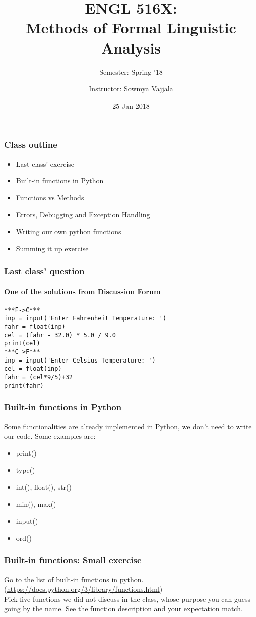 \documentclass{beamer}
\author[Sowmya Vajjala]{Instructor: Sowmya Vajjala}
\title[ENGL 516X]{ENGL 516X: \\ Methods of Formal Linguistic Analysis}
\subtitle{Semester: Spring '18}
\date{25 Jan 2018}
\institute{Iowa State University, USA}
\begin{document}
\begin{frame}\titlepage
\end{frame}


\begin{frame}%
\frametitle{Class outline}
\begin{itemize}
\item Last class' exercise%
\item Built-in functions in Python
\item Functions vs Methods
\item Errors, Debugging and Exception Handling %
\item Writing our own python functions
\item Summing it up exercise%
\end{itemize} %
\end{frame}

\begin{frame}[fragile]
\frametitle{Last class' question}
\framesubtitle{One of the solutions from Discussion Forum}
\begin{verbatim}
***F->C***
inp = input('Enter Fahrenheit Temperature: ')
fahr = float(inp)
cel = (fahr - 32.0) * 5.0 / 9.0
print(cel)
***C->F***
inp = input('Enter Celsius Temperature: ')
cel = float(inp)
fahr = (cel*9/5)+32
print(fahr)
\end{verbatim}
\end{frame}

\begin{frame}
\frametitle{Built-in functions in Python}
Some functionalities are already implemented in Python, we don't need to write our code. Some examples are:
\begin{itemize}
\item print()
\item type()
\item int(), float(), str()
\item min(), max()
\item input()
\item ord()
\end{itemize}
\end{frame}

\begin{frame}%
\frametitle{Built-in functions: Small exercise}%
Go to the list of built-in functions in python. (\url{https://docs.python.org/3/library/functions.html})
\\ 
Pick five functions we did not discuss in the class, whose purpose you can guess going by the name. See the function description and your expectation match.
\end{frame}
\end{document}

